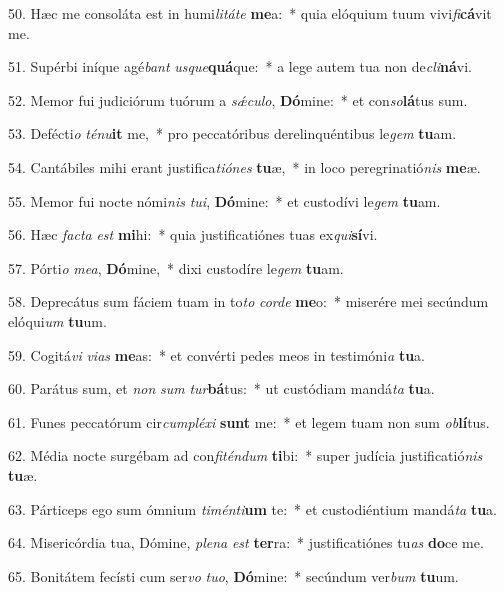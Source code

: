 50. Hæc me consoláta est in humi\textit{li}\textit{tá}\textit{te} \textbf{me}a:~*  quia elóquium tuum vivi\textit{fi}\textbf{cá}vit me.\

51. Supérbi iníque agé\textit{bant} \textit{us}\textit{que}\textbf{quá}que:~*  a lege autem tua non de\textit{cli}\textbf{ná}vi.\

52. Memor fui judiciórum tuórum a \textit{sǽ}\textit{cu}\textit{lo}, \textbf{Dó}mine:~*  et con\textit{so}\textbf{lá}tus sum.\

53. Defécti\textit{o} \textit{té}\textit{nu}\textbf{it} me,~*  pro peccatóribus derelinquéntibus le\textit{gem} \textbf{tu}am.\

54. Cantábiles mihi erant justifica\textit{ti}\textit{ó}\textit{nes} \textbf{tu}æ,~*  in loco peregrinatió\textit{nis} \textbf{me}æ.\

55. Memor fui nocte nómi\textit{nis} \textit{tu}\textit{i}, \textbf{Dó}mine:~*  et custodívi le\textit{gem} \textbf{tu}am.\

56. Hæc \textit{fac}\textit{ta} \textit{est} \textbf{mi}hi:~*  quia justificatiónes tuas ex\textit{qui}\textbf{sí}vi.\

57. Pórti\textit{o} \textit{me}\textit{a}, \textbf{Dó}mine,~*  dixi custodíre le\textit{gem} \textbf{tu}am.\

58. Deprecátus sum fáciem tuam in to\textit{to} \textit{cor}\textit{de} \textbf{me}o:~*  miserére mei secúndum elóqui\textit{um} \textbf{tu}um.\

59. Cogitá\textit{vi} \textit{vi}\textit{as} \textbf{me}as:~*  et convérti pedes meos in testimóni\textit{a} \textbf{tu}a.\

60. Parátus sum, et \textit{non} \textit{sum} \textit{tur}\textbf{bá}tus:~*  ut custódiam mandá\textit{ta} \textbf{tu}a.\

61. Funes peccatórum cir\textit{cum}\textit{plé}\textit{xi} \textbf{sunt} me:~*  et legem tuam non sum \textit{ob}\textbf{lí}tus.\

62. Média nocte surgébam ad con\textit{fi}\textit{tén}\textit{dum} \textbf{ti}bi:~*  super judícia justificatió\textit{nis} \textbf{tu}æ.\

63. Párticeps ego sum ómnium \textit{ti}\textit{mén}\textit{ti}\textbf{um} te:~*  et custodiéntium mandá\textit{ta} \textbf{tu}a.\

64. Misericórdia tua, Dómine, \textit{ple}\textit{na} \textit{est} \textbf{ter}ra:~*  justificatiónes tu\textit{as} \textbf{do}ce me.\

65. Bonitátem fecísti cum ser\textit{vo} \textit{tu}\textit{o}, \textbf{Dó}mine:~*  secúndum ver\textit{bum} \textbf{tu}um.\

